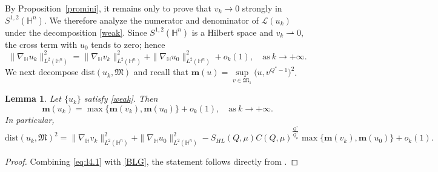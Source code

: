 \documentclass[11pt]{article}
\newtheorem{lemma}{Lemma}[section]
\begin{document}
{By Proposition~\ref{promini}, it remains only to prove that $v_k\to0$ strongly in $S^{1,2}(\mathbb{H}^{n})$. We therefore analyze the numerator and denominator of $\mathcal{L}(u_k)$ under the decomposition \eqref{weak}.}
{Since $S^{1,2}(\mathbb H^n)$ is a Hilbert space and $v_k\rightharpoonup0$, the cross term with $u_0$ tends to zero; hence}
\begin{equation}\label{BLG}
 \|\nabla_\mathbb{H} u_k\|_{L^2(\mathbb{H}^n)}^2=\|\nabla_\mathbb{H} v_k\|_{L^2(\mathbb{H}^n)}^2+\|\nabla_\mathbb{H} u_0\|_{L^2(\mathbb{H}^n)}^2+o_k(1),\quad \mathrm{as} ~k\rightarrow+\infty.
\end{equation}
{We next decompose $\mathrm{dist}(u_k,\mathfrak M)$ and recall that} $\mathbf{m}(u)=\sup\limits_{v\in \mathfrak{M}_1}\big(u,v^{Q^{\ast}-1}\big)^2$.

\begin{lemma}\label{l5.1}
{Let $\{u_k\}$ satisfy \eqref{weak}. Then}
\begin{equation*}
 \mathbf{m}(u_k)=\max\big\{\mathbf{m}(v_k),\mathbf{m}(u_0)\big\}+o_k(1),\quad \mathrm{as} ~k\rightarrow+\infty.
\end{equation*}
In particular,
\begin{equation*}
 \mathrm{dist}(u_k,\mathfrak{M})^2=\|\nabla_\mathbb{H} v_k\|_{L^2(\mathbb{H}^n)}^2+\|\nabla_\mathbb{H} u_0\|_{L^2(\mathbb{H}^n)}^2-S_{HL}(Q,\mu)C(Q,\mu)^{\frac{Q^{\ast}}{Q^{\ast}_{\mu}}}\max\big
 \{\mathbf{m}(v_k),\mathbf{m}(u_0)\big\}+o_k(1).
\end{equation*}
\end{lemma}
\begin{proof}
{Combining \eqref{eq:l4.1} with \eqref{BLG}, the statement follows directly from} \cite[Lemma 4.2]{K25}.
\end{proof}
\end{document}
